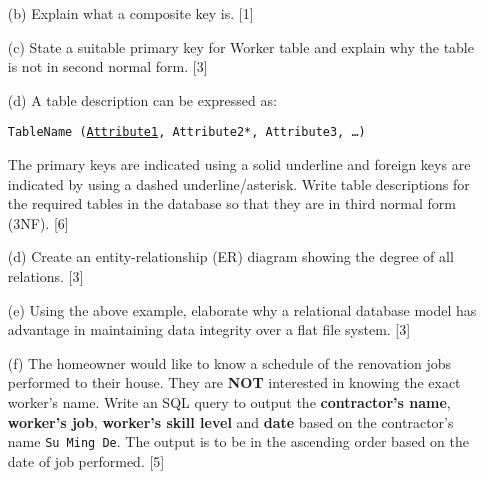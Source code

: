 \begin{enumerate}
\item[(b)] Explain what a composite key is. \hfill{}{[}1{]}
\item[(c)] State a suitable primary key for Worker table and explain why the
table is not in second normal form. \hfill{}{[}3{]}
\item[(d)] A table description can be expressed as: 

\texttt{TableName (}\texttt{\uline{Attribute1}}\texttt{, Attribute2{*},
Attribute3, \dots ) }

The primary keys are indicated using a solid underline and foreign
keys are indicated by using a dashed underline/asterisk. Write table
descriptions for the required tables in the database so that they
are in third normal form (3NF). \hfill{} {[}6{]}
\item[(d)] Create an entity-relationship (ER) diagram showing the degree of
all relations. \hfill{}{[}3{]}
\item[(e)] Using the above example, elaborate why a relational database model
has advantage in maintaining data integrity over a flat file system.
\hfill{}{[}3{]}
\item[(f)] The homeowner would like to know a schedule of the renovation jobs
performed to their house. They are \textbf{NOT} interested in knowing
the exact worker\textquoteright s name. Write an SQL query to output
the \textbf{contractor\textquoteright s name}, \textbf{worker\textquoteright s
job}, \textbf{worker\textquoteright s skill level} and \textbf{date}
based on the contractor\textquoteright s name \textquotedbl\texttt{Su
Ming De}\textquotedbl . The output is to be in the ascending order
based on the date of job performed. \hfill{}{[}5{]}
\end{enumerate}